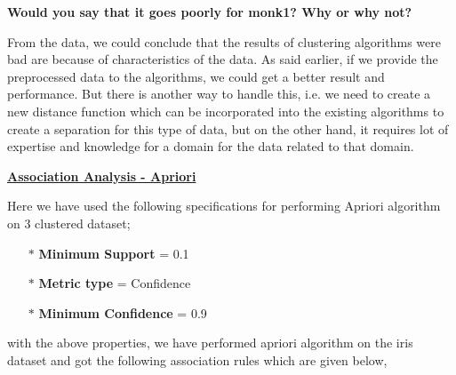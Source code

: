 \documentclass[a4paper,10pt]{article}
\begin{document}
\par
\textbf{Would you say that it goes poorly for monk1? Why or why not?} \par
From the data, we could conclude that the results of clustering algorithms were bad are because of
characteristics of the data. As said earlier, if we provide the preprocessed data to the algorithms,
we could get a better result and performance. But there is another way to handle this, i.e. we need 
to create a new distance function which can be incorporated into the existing algorithms to create
a separation for this type of data, but on the other hand, it requires lot of expertise and knowledge
for a domain for the data related to that domain.
\par
\textbf{\underline{Association Analysis - Apriori}} \par
Here we have used the following specifications for performing Apriori algorithm on 3 clustered dataset;
\begin{enumerate}
  \item [$*$] \textbf{Minimum Support} = 0.1
  \item [$*$] \textbf{Metric type} = Confidence
  \item [$*$] \textbf{Minimum Confidence} = 0.9
\end{enumerate}
with the above properties, we have performed apriori algorithm on the iris dataset and got the following association rules
which are given below,
\end{document}
